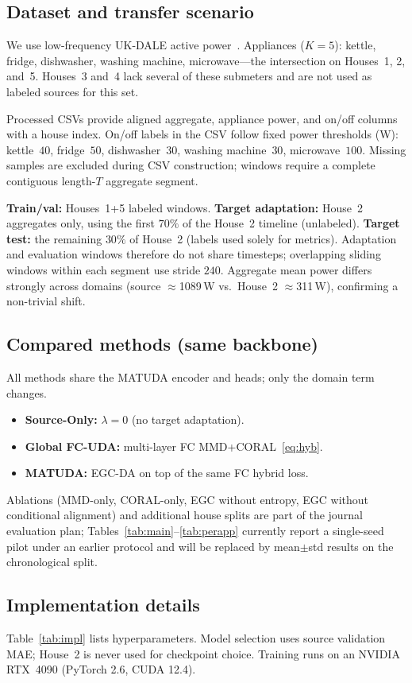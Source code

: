 \documentclass[journal]{IEEEtran}
\begin{document}
\subsection{Dataset and transfer scenario}
We use low-frequency UK-DALE active power~\cite{kelly2015ukdale}.
Appliances ($K{=}5$): kettle, fridge, dishwasher, washing machine, microwave---the intersection on Houses~1, 2, and~5.
Houses~3 and~4 lack several of these submeters and are not used as labeled sources for this set.

Processed CSVs provide aligned aggregate, appliance power, and on/off columns with a house index.
On/off labels in the CSV follow fixed power thresholds (W): kettle~$40$, fridge~$50$, dishwasher~$30$, washing machine~$30$, microwave~$100$.
Missing samples are excluded during CSV construction; windows require a complete contiguous length-$T$ aggregate segment.

\textbf{Train/val:} Houses~1+5 labeled windows.
\textbf{Target adaptation:} House~2 aggregates only, using the first $70\%$ of the House~2 timeline (unlabeled).
\textbf{Target test:} the remaining $30\%$ of House~2 (labels used solely for metrics).
Adaptation and evaluation windows therefore do not share timesteps; overlapping sliding windows within each segment use stride $240$.
Aggregate mean power differs strongly across domains (source $\approx$1089\,W vs.\ House~2 $\approx$311\,W), confirming a non-trivial shift.

\subsection{Compared methods (same backbone)}
All methods share the MATUDA encoder and heads; only the domain term changes.
\begin{itemize}
\item \textbf{Source-Only:} $\lambda{=}0$ (no target adaptation).
\item \textbf{Global FC-UDA:} multi-layer FC MMD+CORAL~\eqref{eq:hyb}.
\item \textbf{MATUDA:} EGC-DA on top of the same FC hybrid loss.
\end{itemize}
Ablations (MMD-only, CORAL-only, EGC without entropy, EGC without conditional alignment) and additional house splits are part of the journal evaluation plan; Tables~\ref{tab:main}--\ref{tab:perapp} currently report a single-seed pilot under an earlier protocol and will be replaced by mean$\pm$std results on the chronological split.

\subsection{Implementation details}
Table~\ref{tab:impl} lists hyperparameters.
Model selection uses source validation MAE; House~2 is never used for checkpoint choice.
Training runs on an NVIDIA RTX~4090 (PyTorch 2.6, CUDA 12.4).
\end{document}
